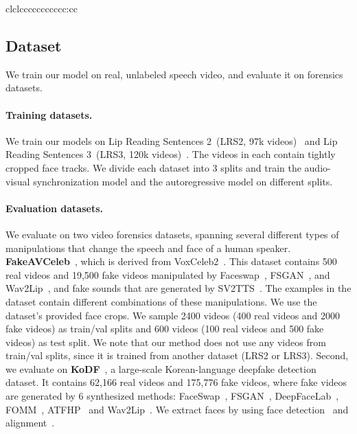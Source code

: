 \documentclass[10pt,twocolumn,letterpaper]{article}
\newcommand{\mypar}[1]{\vspace{-3mm}\paragraph{#1}}
\begin{document}
\begin{table*}[t!]
{\begin{tabular}{clclccccccccccc:cc}
\bottomrule
\end{tabular}
}
\caption{\textbf{Manipulation detection on FakeAVCeleb.} We report AP scores $(\%)$ and AUC scores $(\%)$, following the evaluation protocol of Haliassos et al.~\cite{haliassos2021lips}, in which supervised methods are evaluated on unseen manipulation types (unsupervised methods are not trained with labels and fake examples). We report results with combinations of real/fake video/audio, using different manipulation algorithms. We report the average performance over four fake video~(FV) categories in AVG-FV. We retrained all supervised models on FakeAVCeleb~\cite{NEURIPS_DATASETS_AND_BENCHMARKS2021_d9d4f495}.}
\label{comparison_with_others}
\end{table*}
 
\subsection{Dataset}
We train our model on real, unlabeled speech video, and evaluate it on forensics datasets.

\mypar{Training datasets.} We train our models on Lip Reading Sentences 2~(LRS2, 97k videos)~\cite{Afouras18c} and Lip Reading Sentences 3~(LRS3, 120k videos)~\cite{afouras2018lrs3}. The videos in each contain tightly cropped face tracks. We divide each dataset into 3 splits and train the audio-visual synchronization model and the autoregressive model on different splits.




\mypar{Evaluation datasets.} 
We evaluate on two video forensics datasets, spanning several different types of manipulations that change the speech and face of a human speaker. 
\textbf{FakeAVCeleb}~\cite{NEURIPS_DATASETS_AND_BENCHMARKS2021_d9d4f495}, which is derived from VoxCeleb2~\cite{chung2018voxceleb2}. This dataset contains 500 real videos and 19,500 fake videos manipulated by Faceswap~\cite{korshunova2017fast}, FSGAN~\cite{nirkin2019fsgan}, and Wav2Lip~\cite{prajwal2020lip}, and fake sounds that are generated by SV2TTS~\cite{jia2018transfer}. The examples in the dataset contain different combinations of these manipulations. We use the dataset's provided face crops. We sample 2400 videos (400 real videos and 2000 fake videos) as train/val splits and 600 videos (100 real videos and 500 fake videos) as test split. We note that our method does not use any videos from train/val splits, since it is trained from another dataset (LRS2 or LRS3). Second, we evaluate on \textbf{KoDF}~\cite{kwon2021kodf}, a large-scale Korean-language deepfake detection dataset. It contains 62,166 real videos and 175,776 fake videos, where fake videos are generated by 6 synthesized methods: FaceSwap~\cite{faceswap}, FSGAN~\cite{nirkin2019fsgan}, DeepFaceLab~\cite{perov2020deepfacelab}, FOMM~\cite{siarohin2019first}, ATFHP~\cite{yi2020audio} and Wav2Lip~\cite{prajwal2020lip}. We extract faces by using face detection~\cite{zhang2017s3fd} and alignment~\cite{bulat2017far}. 
\end{document}
